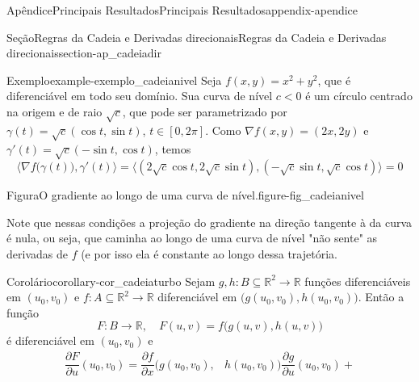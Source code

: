 \documentclass[oneside,10pt,]{book}
\numberwithin{equation}{section}
\newcommand{\R}{\mathbb R}
\begin{document}
\begin{appendixptx}{Apêndice}{Principais Resultados}{}{Principais Resultados}{}{}{appendix-apendice}
\begin{sectionptx}{Seção}{Regras da Cadeia e Derivadas direcionais}{}{Regras da Cadeia e Derivadas direcionais}{}{}{section-ap_cadeiadir}
\begin{example}{Exemplo}{}{example-exemplo_cadeianivel}%
Seja \(f(x,y)=x^2+y^2\), que é diferenciável em todo seu domínio. Sua curva de nível \(c<0\) é um círculo centrado na origem e de raio \(\sqrt{c}\), que pode ser parametrizado por \(\gamma(t)=\sqrt{c}(\cos t, \sin t)\), \(t\in
[0,2\pi]\). Como \(\nabla f(x,y)=(2x,2y)\) e \(\gamma'(t)=\sqrt{c}(-\sin t, \cos t)\), temos%
\begin{equation*}
\Big\langle\nabla
f\big(\gamma(t)\big),\gamma'(t)\Big\rangle=\big\langle
(2\sqrt{c}\cos t, 2\sqrt{c}\sin t),(-\sqrt{c}\sin t,\sqrt{c}\cos
t)\big\rangle =0
\end{equation*}
%
\begin{figureptx}{Figura}{O gradiente ao longo de uma curva de nível.}{figure-fig_cadeianivel}{}%
\begin{image}{0.25}{0.5}{0.25}{}%
%
\end{image}%
\tcblower
\end{figureptx}%
Note que nessas condições a projeção do gradiente na direção tangente à da curva é nula, ou seja, que caminha ao longo de uma curva de nível "não sente" as derivadas de \(f\) (e por isso ela é constante ao longo dessa trajetória.%
\end{example}
\begin{corollary}{Corolário}{}{}{corollary-cor_cadeiaturbo}%
Sejam \(g,h\colon B\subseteq\R^2\to\R\) funções diferenciáveis em \((u_0,v_0)\) e \(f\colon A\subseteq\R^2\to\R\) diferenciável em \(\big(g(u_0,v_0),h(u_0,v_0)\big)\). Então a função%
\begin{equation*}
F\colon B\to\R,\quad
F(u,v)=f\big(g(u,v),h(u,v)\big)
\end{equation*}
é diferenciável em \((u_0,v_0)\) e%
\begin{align*}
\dfrac{\partial F}{\partial u}(u_0,v_0)
=\dfrac{\partial f}{\partial
x}\big(g(u_0,v_0),&h(u_0,v_0)\big)\dfrac{\partial g}{\partial
u}(u_0,v_0)+\\

\end{align*}
\end{corollary}
\end{sectionptx}
\end{appendixptx}
\end{document}

